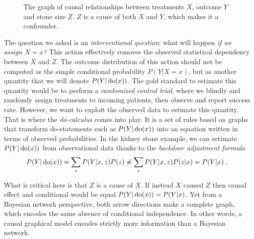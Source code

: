 \begin{figure}
    \centering
    \caption{The graph of causal relationships between treatments $X$, outcome $Y$ and stone size $Z$. $Z$ is a cause of both $X$ and $Y$, which makes it a confounder.}
    \label{fig:simpsons_paradox}
\end{figure}

The question we asked is an \textit{interventional question}: what will happen \textit{if we assign $X=x$?} This action effectively removes the observed statistical dependency between $X$ and $Z$. The outcome distribution of this action should not be computed as the simple conditional probability $P(Y|X=x)$, but as another quantity that we will denote $P(Y| \operatorname{\mathrm{do}}(x))$. The gold standard to estimate this quantity would be to perform a \textit{randomized control trial}, where we blindly and randomly assign treatments to incoming patients, then observe and report success rate. However, we want to exploit the observed data to estimate this quantity. That is where the \textit{do-calculus} comes into play. It is a set of rules based on graphs that transform do-statements such as $P(Y| \operatorname{\mathrm{do}}(x))$ into an equation written in terms of observed probabilities. 
In the kidney stone example, we can estimate $P(Y| \operatorname{\mathrm{do}}(x))$ from observational data thanks to the \textit{backdoor adjustment formula}
\begin{align}
	P(Y|\operatorname{\mathrm{do}}(x)) = \sum_z P(Y | x, z) P(z) 
	\neq \sum_z P(Y | x, z) P(z|x) = P(Y | x) \; .
	\label{eq:backdoor_adjustment}
\end{align}

What is critical here is that $Z$ is a cause of $X$. If instead $X$ caused $Z$ then causal effect and conditional would be equal $P(Y|\operatorname{\mathrm{do}}(x)) = P(Y | x)$. Yet from a Bayesian network perspective, both arrow directions make a complete graph, which encodes the same absence of conditional independence. In other words, a causal graphical model encodes strictly more information than a Bayesian network.


